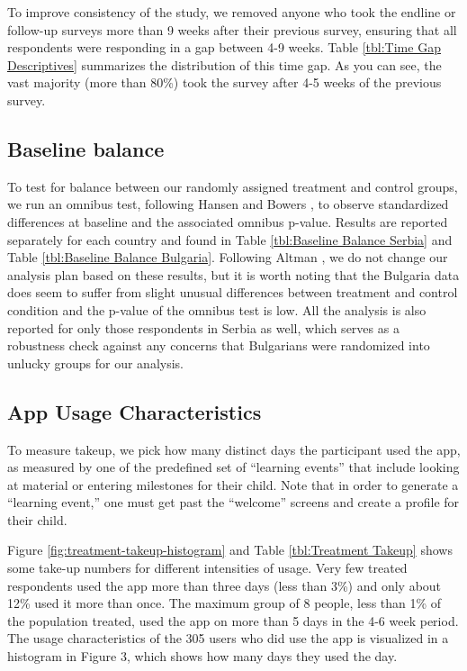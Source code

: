 To improve consistency of the study, we removed anyone who took the endline or follow-up surveys more than 9 weeks after their previous survey, ensuring that all respondents were responding in a gap between 4-9 weeks. Table \ref{tbl:Time Gap Descriptives} summarizes the distribution of this time gap. As you can see, the vast majority (more than 80\%) took the survey after 4-5 weeks of the previous survey.



\subsection{Baseline balance}


To test for balance between our randomly assigned treatment and control groups, we run an omnibus test, following Hansen and Bowers \parencite*{Hansen2008}, to observe standardized differences at baseline and the associated omnibus p-value. Results are reported separately for each country and found in Table \ref{tbl:Baseline Balance Serbia} and Table \ref{tbl:Baseline Balance Bulgaria}. Following Altman \parencite*{Altman2014}, we do not change our analysis plan based on these results, but it is worth noting that the Bulgaria data does seem to suffer from slight unusual differences between treatment and control condition and the p-value of the omnibus test is low. All the analysis is also reported for only those respondents in Serbia as well, which serves as a robustness check against any concerns that Bulgarians were randomized into unlucky groups for our analysis.




\subsection*{App Usage Characteristics}


To measure takeup, we pick how many distinct days the participant used the app, as measured by one of the predefined set of ``learning events'' that include looking at material or entering milestones for their child. Note that in order to generate a ``learning event,'' one must get past the ``welcome'' screens and create a profile for their child.

Figure \ref{fig:treatment-takeup-histogram} and Table \ref{tbl:Treatment Takeup} shows some take-up numbers for different intensities of usage. Very few treated respondents used the app more than three days (less than 3\%) and only about 12\% used it more than once. The maximum group of 8 people, less than 1\% of the population treated, used the app on more than 5 days in the 4-6 week period. The usage characteristics of the 305 users who did use the app is visualized in a histogram in Figure 3, which shows how many days they used the day.


